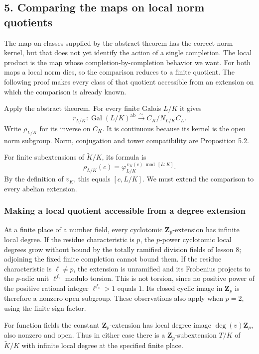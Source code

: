 \documentclass[11pt,a4paper]{article}
\begin{document}
\subsection{5. Comparing the maps on local norm
quotients}\label{comparing-the-maps-on-local-norm-quotients}

The map on classes supplied by the abstract theorem has the correct norm
kernel, but that does not yet identify the action of a single
completion. The local product is the map whose completion-by-completion
behavior we want. For both maps a local norm dies, so the comparison
reduces to a finite quotient. The following proof makes every class of
that quotient accessible from an extension on which the comparison is
already known.

Apply the abstract theorem. For every finite Galois \(L/K\) it gives \[
r_{L/K}:\operatorname{Gal}(L/K)^{\mathrm{ab}}
\xrightarrow{\sim}C_K/N_{L/K}C_L.
\tag{10}
\] Write \(\rho_{L/K}\) for its inverse on \(C_K\). It is continuous
because its kernel is the open norm subgroup. Norm, conjugation and
tower compatibility are Proposition 5.2.

For finite subextensions of \(\widetilde K/K\), its formula is \[
\rho_{L/K}(c)=\varphi_{L/K}^{\,v_K(c)\bmod[L:K]}.
\tag{11}
\] By the definition of \(v_K\), this equals \([c,L/K]\). We must extend
the comparison to every abelian extension.

\subsubsection{Making a local quotient accessible from a degree
extension}\label{making-a-local-quotient-accessible-from-a-degree-extension}

At a finite place of a number field, every cyclotomic
\(\mathbf Z_p\)-extension has infinite local degree. If the residue
characteristic is \(p\), the \(p\)-power cyclotomic local degrees grow
without bound by the totally ramified division fields of lesson 8;
adjoining the fixed finite completion cannot bound them. If the residue
characteristic is \(\ell\ne p\), the extension is unramified and its
Frobenius projects to the \(p\)-adic unit \(\ell^{f_v}\) modulo torsion.
This is not torsion, since no positive power of the positive rational
integer \(\ell^{f_v}>1\) equals \(1\). Its closed cyclic image in
\(\mathbf Z_p\) is therefore a nonzero open subgroup. These observations
also apply when \(p=2\), using the finite sign factor.

For function fields the constant \(\mathbf Z_p\)-extension has local
degree image \(\deg(v)\mathbf Z_p\), also nonzero and open. Thus in
either case there is a \(\mathbf Z_p\)-subextension \(T/K\) of
\(\widetilde K/K\) with infinite local degree at the specified finite
place.
\end{document}
